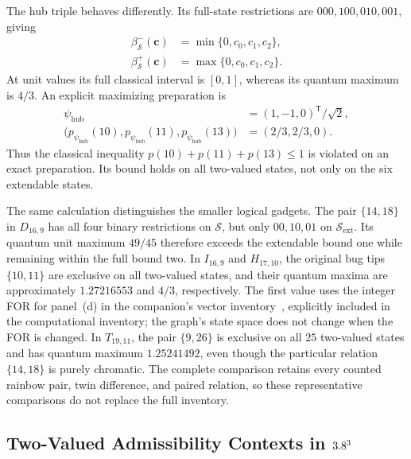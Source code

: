 \documentclass[aps,pra,reprint,superscriptaddress,longbibliography,nofootinbib,floatfix,10pt]{revtex4-2}
\theoremstyle{definition}\newtheorem{definition}[theorem]{Definition}
\theoremstyle{remark}\newtheorem{remark}[theorem]{Remark}
\newcommand{\Sc}{\mathcal S}\newcommand{\Cc}{\mathcal C}\newcommand{\Wc}{\mathcal W}
\begin{document}
The hub triple behaves differently. Its full-state restrictions are $000,100,010,001$, giving
\begin{equation}\label{eq:classical-hub-envelope}
\begin{aligned}
\beta^-_{\Sc}(\mathbf c)&=\min\{0,c_0,c_1,c_2\},\\
\beta^+_{\Sc}(\mathbf c)&=\max\{0,c_0,c_1,c_2\}.
\end{aligned}
\end{equation}
At unit values its full classical interval is $[0,1]$, whereas its quantum maximum is $4/3$. An explicit maximizing preparation is
\begin{equation}\label{eq:H21-hub-explicit-witness}
\begin{aligned}
\psi_{\mathrm{hub}}&=(1,-1,0)^{\mathsf T}/\sqrt2,\\
\bigl(p_{\psi_{\mathrm{hub}}}(10),p_{\psi_{\mathrm{hub}}}(11),p_{\psi_{\mathrm{hub}}}(13)\bigr)
&=(2/3,2/3,0).
\end{aligned}
\end{equation}
Thus the classical inequality $p(10)+p(11)+p(13)\le1$ is violated on an exact preparation. Its bound holds on all two-valued states, not only on the six extendable states.

The same calculation distinguishes the smaller logical gadgets. The pair $\{14,18\}$ in $D_{16,9}$ has all four binary restrictions on $\Sc$, but only $00,10,01$ on $\Sc_{\mathrm{ext}}$. Its quantum unit maximum $49/45$ therefore exceeds the extendable bound one while remaining within the full bound two. In $I_{16,9}$ and $H_{17,10}$, the original bug tips $\{10,11\}$ are exclusive on all two-valued states, and their quantum maxima are approximately $1.27216553$ and $4/3$, respectively. The first value uses the integer FOR for panel~(d) in the companion's vector inventory~\cite{supplement}, explicitly included in the computational inventory; the graph's state space does not change when the FOR is changed. In $T_{19,11}$, the pair $\{9,26\}$ is exclusive on all $25$ two-valued states and has quantum maximum $1.25241492$, even though the particular relation $\{14,18\}$ is purely chromatic. The complete comparison retains every counted rainbow pair, twin difference, and paired relation, so these representative comparisons do not replace the full inventory.

\subsection{Two-Valued Admissibility Contexts in \texorpdfstring{$3.8^3$}{R3}}\label{sec:tvs-admissibility}
\end{document}
